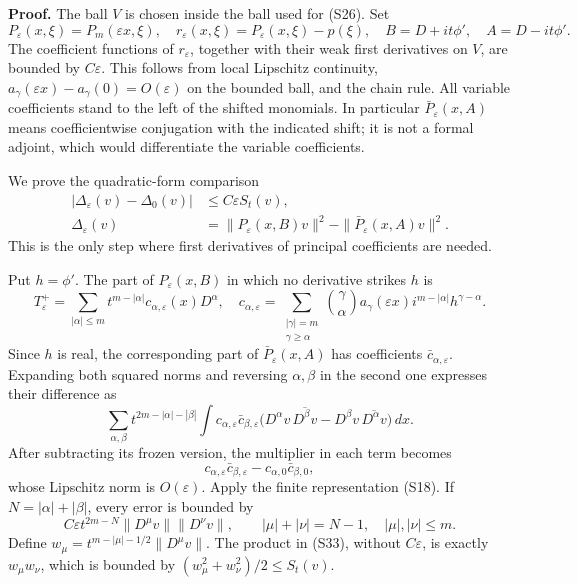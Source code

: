 \documentclass[
  11pt,
]{article}
\begin{document}
\textbf{Proof.} The ball \(V\) is chosen inside the ball used for (S26).
Set \[
 P_\varepsilon(x,\xi)=P_m(\varepsilon x,\xi),\quad
 r_\varepsilon(x,\xi)=P_\varepsilon(x,\xi)-p(\xi),\quad
 B=D+it\phi',\quad A=D-it\phi'.                                  \tag{S29}
\] The coefficient functions of \(r_\varepsilon\), together with their
weak first derivatives on \(V\), are bounded by \(C\varepsilon\). This
follows from local Lipschitz continuity,
\(a_\gamma(\varepsilon x)-a_\gamma(0)=O(\varepsilon)\) on the bounded
ball, and the chain rule. All variable coefficients stand to the left of
the shifted monomials. In particular \(\bar P_\varepsilon(x,A)\) means
coefficientwise conjugation with the indicated shift; it is not a formal
adjoint, which would differentiate the variable coefficients.

We prove the quadratic-form comparison \[
\begin{split}
 |\Delta_\varepsilon(v)-\Delta_0(v)|&\leq C\varepsilon S_t(v),\\
 \Delta_\varepsilon(v)&=
    \|P_\varepsilon(x,B)v\|^2-\|\bar P_\varepsilon(x,A)v\|^2.
\end{split}                                                       \tag{S30}
\] This is the only step where first derivatives of principal
coefficients are needed.

Put \(h=\phi'\). The part of \(P_\varepsilon(x,B)\) in which no
derivative strikes \(h\) is \[
 T_\varepsilon^+=\sum_{|\alpha|\leq m}
             t^{m-|\alpha|}c_{\alpha,\varepsilon}(x)D^\alpha,
 \quad
 c_{\alpha,\varepsilon}
 =\sum_{\substack{|\gamma|=m\\\gamma\geq\alpha}}
  \binom{\gamma}{\alpha}a_\gamma(\varepsilon x)
            i^{m-|\alpha|}h^{\gamma-\alpha}.                     \tag{S31}
\] Since \(h\) is real, the corresponding part of
\(\bar P_\varepsilon(x,A)\) has coefficients
\(\bar c_{\alpha,\varepsilon}\). Expanding both squared norms and
reversing \(\alpha,\beta\) in the second one expresses their difference
as \[
 \sum_{\alpha,\beta}t^{2m-|\alpha|-|\beta|}
  \int c_{\alpha,\varepsilon}\bar c_{\beta,\varepsilon}
   \bigl(D^\alpha v\,\overline{D^\beta v}
        -D^\beta v\,\overline{D^\alpha v}\bigr)\,dx.              \tag{S32}
\] After subtracting its frozen version, the multiplier in each term
becomes \[
 c_{\alpha,\varepsilon}\bar c_{\beta,\varepsilon}
       -c_{\alpha,0}\bar c_{\beta,0},
\] whose Lipschitz norm is \(O(\varepsilon)\). Apply the finite
representation (S18). If \(N=|\alpha|+|\beta|\), every error is bounded
by \[
 C\varepsilon t^{2m-N}\|D^\mu v\|\|D^\nu v\|,
 \qquad |\mu|+|\nu|=N-1,\quad |\mu|,|\nu|\leq m.                  \tag{S33}
\] Define \(w_\mu=t^{m-|\mu|-1/2}\|D^\mu v\|\). The product in (S33),
without \(C\varepsilon\), is exactly \(w_\mu w_\nu\), which is bounded
by \((w_\mu^2+w_\nu^2)/2\leq S_t(v)\).
\end{document}
